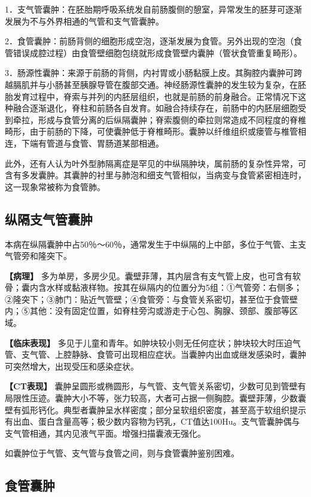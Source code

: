 1．支气管囊肿：在胚胎期呼吸系统发自前肠腹侧的憩室，异常发生的胚芽可逐渐发展为不与外界相通的气管和支气管囊肿。

2．食管囊肿：前肠背侧的细胞形成空泡，逐渐发展为食管。另外出现的空泡（食管错误成腔过程）由食管壁细胞包绕就形成食管壁内囊肿（管状食管重复畸形）。

3．肠源性囊肿：来源于前肠的背侧，内衬胃或小肠黏膜上皮。其胸腔内囊肿可跨越膈肌并与小肠甚至胰腺导管在腹部交通。神经肠源性囊肿的发生较为复杂，在胚胎发育过程中，脊索与并列的内胚层组织，也就是前肠的前身融合。正常情况下这种融合逐渐退化，脊柱和前肠各自发育。如融合持续存在，前肠中的内胚层细胞受到牵拉，形成与食管分离的后纵隔囊肿；脊索腹侧的牵拉则常造成不同程度的脊椎畸形，由于前肠的下降，可使囊肿低于脊椎畸形。囊肿以纤维组织或瘘管与椎管相连，下端有管道与食管、胃肠道某部相通。

此外，还有人认为叶外型肺隔离症是罕见的中纵隔肿块，属前肠的复杂性异常，可含有多发囊肿。其囊肿的衬里与肺泡和细支气管相似，当病变与食管紧密相连时，这一现象常被称为食管肺。

\subsection{纵隔支气管囊肿}

本病在纵隔囊肿中占50％～60％，通常发生于中纵隔的上中部，多位于气管、主支气管旁和隆突下。

\textbf{【病理】}
多为单房，多房少见。囊壁菲薄，其内层含有支气管上皮，也可含有软骨；囊内含水样或黏液样物。按其在纵隔内的位置分为5组：①气管旁：右侧多；②隆突下；③肺门：贴近气管壁；④食管旁：与食管关系密切，甚至位于食管壁内；⑤其他：没有固定位置，如脊柱旁沟或游走于心包、胸腺、颈部、腹部等区域。

\textbf{【临床表现】}
多见于儿童和青年。如肿块较小则无任何症状；肿块较大时压迫气管、支气管、上腔静脉、食管可出现相应症状。当囊肿内出血或继发感染时，囊肿可突然增大，出现受压和感染症状。

\textbf{【CT表现】}
囊肿呈圆形或椭圆形，与气管、支气管关系密切，少数可见到管壁有局限性压迹。囊肿大小不等，张力较高，大者可占据一侧胸腔。囊壁菲薄，少数囊壁有弧形钙化。典型者囊肿呈水样密度；部分呈软组织密度，甚至高于软组织提示有出血、蛋白含量高等；极少数内容物为钙乳，CT值达100Hu。支气管囊肿偶与支气管相通，其内见液气平面。增强扫描囊液无强化。

如囊肿位于气管、支气管与食管之间，则与食管囊肿鉴别困难。

\subsection{食管囊肿}

